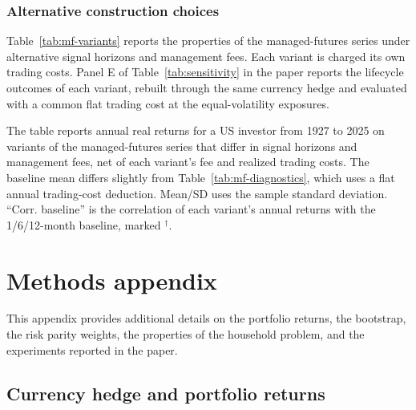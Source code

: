 \subsubsection{Alternative construction choices}
\label{app:mf-variants}

Table~\ref{tab:mf-variants} reports the properties of the managed-futures series under alternative signal
horizons and management fees. Each variant is charged its own trading costs. Panel E of
Table~\ref{tab:sensitivity} in the paper reports the lifecycle outcomes of each variant, rebuilt through the
same currency hedge and evaluated with a common flat trading cost at the equal-volatility exposures.

\begin{table}[p]
\centering
\caption{Managed-futures series under alternative construction choices}
\label{tab:mf-variants}
\begin{minipage}{\linewidth}\small The table reports annual real returns for a US investor from 1927 to
2025 on variants of the managed-futures series that differ in signal horizons and management fees, net of
each variant's fee and realized trading costs. The baseline mean differs slightly from
Table~\ref{tab:mf-diagnostics}, which uses a flat annual trading-cost deduction. Mean/SD uses the sample
standard deviation. ``Corr. baseline'' is the correlation of each variant's annual returns with the
1/6/12-month baseline, marked $^{\dagger}$.\end{minipage}
\medskip

\small
\resizebox{\linewidth}{!}{}
\end{table}

\clearpage
\section{Methods appendix}
\label{app:methods}

This appendix provides additional details on the portfolio returns, the bootstrap, the risk parity
weights, the properties of the household problem, and the experiments reported in the paper.

\subsection{Currency hedge and portfolio returns}
\label{app:hedge}

